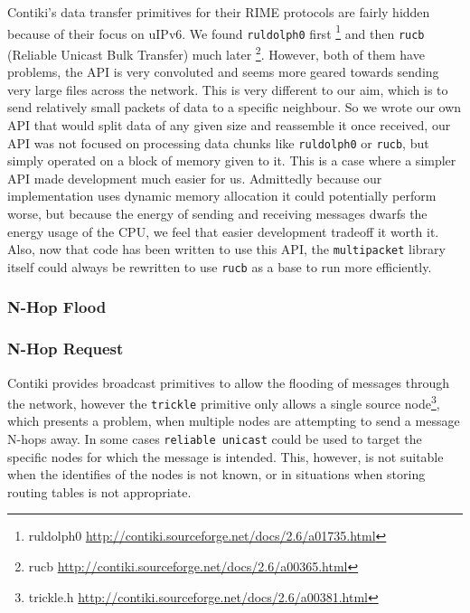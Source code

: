 Contiki's data transfer primitives for their RIME protocols are fairly hidden because of their focus on uIPv6. We found \verb|ruldolph0| first \footnote{ruldolph0 \url{http://contiki.sourceforge.net/docs/2.6/a01735.html}} and then \verb|rucb| (Reliable Unicast Bulk Transfer) much later \footnote{rucb \url{http://contiki.sourceforge.net/docs/2.6/a00365.html}}. However, both of them have problems, the API is very convoluted and seems more geared towards sending very large files across the network. This is very different to our aim, which is to send relatively small packets of data to a specific neighbour. So we wrote our own API that would split data of any given size and reassemble it once received, our API was not focused on processing data chunks like \verb|ruldolph0| or \verb|rucb|, but simply operated on a block of memory given to it. This is a case where a simpler API made development much easier for us. Admittedly because our implementation uses dynamic memory allocation it could potentially perform worse, but because the energy of sending and receiving messages dwarfs the energy usage of the CPU, we feel that easier development tradeoff it worth it. Also, now that code has been written to use this API, the \verb|multipacket| library itself could always be rewritten to use \verb|rucb| as a base to run more efficiently.


\subsubsection{N-Hop Flood}

\subsubsection{N-Hop Request}
Contiki provides broadcast primitives to allow the flooding of messages through the network, however the \verb|trickle|\cite{Levis04trickle} primitive only allows a single source node\footnote{trickle.h \url{http://contiki.sourceforge.net/docs/2.6/a00381.html}}, which presents a problem, when multiple nodes are attempting to send a message N-hops away. 
In some cases \verb|reliable unicast| could be used to target the specific nodes for which the message is intended. This, however, is not suitable when the identifies of the nodes is not known, or in situations when storing routing tables is not appropriate. 

